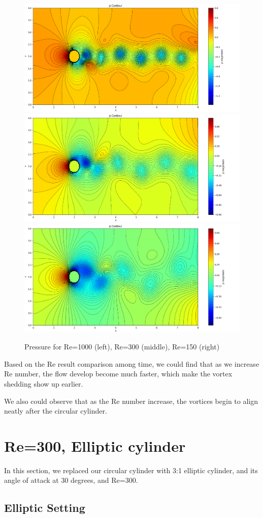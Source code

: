 \documentclass[12pt]{article}
\begin{document}
\begin{figure}[H]
    \centering
    \includegraphics[width=0.3\linewidth]{figure/N32_Re1000_8x4_t100/p_N32_Re1000_8x4_t100.jpg}
    \includegraphics[width=0.3\linewidth]{figure/N32_Re300_8x4_t100/p_N32_Re300_8x4_t100.jpg}
    \includegraphics[width=0.3\linewidth]{figure/N32_Re150_8x4_t100/p_N32_Re150_8x4_t100.jpg}
    \caption{Pressure for Re=1000 (left), Re=300 (middle), Re=150 (right)}
\end{figure}



Based on the Re result comparison among time, we could find that as we increase Re number, the flow develop become much faster, which make the vortex shedding show up earlier. 

We also could observe that as the Re number increase, the vortices begin to align neatly after the circular cylinder.











\newpage
\section{Re=300, Elliptic cylinder}


In this section, we replaced our circular cylinder with 3:1 elliptic cylinder, and its angle of attack at 30 degrees, and Re=300. 

\subsection{Elliptic Setting}
\end{document}
